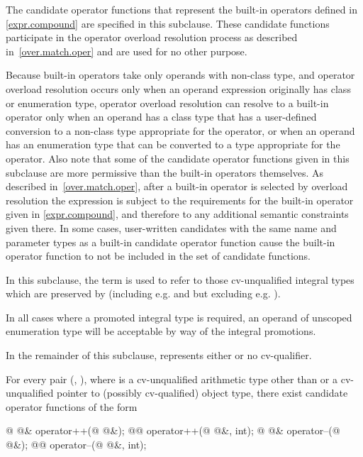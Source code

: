 \pnum
The candidate operator functions that represent the built-in operators
defined in \ref{expr.compound} are specified in this subclause.
These candidate
functions participate in the operator overload resolution process as
described in~\ref{over.match.oper} and are used for no other purpose.
\begin{note}
Because built-in operators take only operands with non-class type,
and operator overload resolution occurs only when an operand expression
originally has class or enumeration type,
operator overload resolution can resolve to a built-in operator only
when an operand has a class type that has a user-defined conversion to
a non-class type appropriate for the operator, or when an operand has
an enumeration type that can be converted to a type appropriate
for the operator.
Also note that some of the candidate operator functions given in this subclause are
more permissive than the built-in operators themselves.
As
described in~\ref{over.match.oper}, after a built-in operator is selected
by overload resolution the expression is subject to the requirements for
the built-in operator given in \ref{expr.compound}, and therefore to any
additional semantic constraints given there.
In some cases, user-written candidates
with the same name and parameter types as a built-in
candidate operator function cause the built-in operator function
to not be included in the set of candidate functions.
\end{note}

\pnum
{}%
%
In this subclause, the term
is used to refer to those cv-unqualified integral types which are preserved by
 (including e.g.
and
but excluding e.g.
).
\begin{note}
In all cases where a promoted integral type is
required, an operand of unscoped enumeration type will be acceptable by way of the
integral promotions.
\end{note}

\pnum
In the remainder of this subclause,  represents either
 or no cv-qualifier.

\pnum
For every pair
(,
),
where
is a cv-unqualified arithmetic type other than 
or a cv-unqualified pointer to (possibly cv-qualified) object type,
there exist candidate operator functions of the form
\begin{codeblock}
@ @& operator++(@ @&);
@@ operator++(@ @&, int);
@ @& operator--(@ @&);
@@ operator--(@ @&, int);
\end{codeblock}

